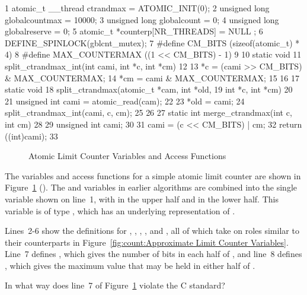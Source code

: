 { \scriptsize
\begin{verbbox}
  1 atomic_t __thread ctrandmax = ATOMIC_INIT(0);
  2 unsigned long globalcountmax = 10000;
  3 unsigned long globalcount = 0;
  4 unsigned long globalreserve = 0;
  5 atomic_t *counterp[NR_THREADS] = { NULL };
  6 DEFINE_SPINLOCK(gblcnt_mutex);
  7 #define CM_BITS (sizeof(atomic_t) * 4)
  8 #define MAX_COUNTERMAX ((1 << CM_BITS) - 1)
  9 
 10 static void
 11 split_ctrandmax_int(int cami, int *c, int *cm)
 12 {
 13   *c = (cami >> CM_BITS) & MAX_COUNTERMAX;
 14   *cm = cami & MAX_COUNTERMAX;
 15 }
 16 
 17 static void
 18 split_ctrandmax(atomic_t *cam, int *old,
 19                     int *c, int *cm)
 20 {
 21   unsigned int cami = atomic_read(cam);
 22 
 23   *old = cami;
 24   split_ctrandmax_int(cami, c, cm);
 25 }
 26 
 27 static int merge_ctrandmax(int c, int cm)
 28 {
 29   unsigned int cami;
 30 
 31   cami = (c << CM_BITS) | cm;
 32   return ((int)cami);
 33 }
\end{verbbox}
}
\begin{figure}[tbp]
\centering
\theverbbox
\caption{Atomic Limit Counter Variables and Access Functions}
\label{fig:count:Atomic Limit Counter Variables and Access Functions}
\end{figure}

The variables and access functions for a simple atomic limit counter
are shown in
Figure~\ref{fig:count:Atomic Limit Counter Variables and Access Functions}
().
The  and  variables in earlier algorithms
are combined into the single variable  shown on
line~1, with  in the upper half and  in
the lower half.
This variable is of type , which has an underlying
representation of .

Lines~2-6 show the definitions for , ,
, , and , all of which
take on roles similar to their counterparts in
Figure~\ref{fig:count:Approximate Limit Counter Variables}.
Line~7 defines , which gives the number of bits in each half
of , and line~8 defines , which
gives the maximum value that may be held in either half of
.

\QuickQuiz{}
	In what way does line~7 of
	Figure~\ref{fig:count:Atomic Limit Counter Variables and Access Functions}
	violate the C standard?
 \QuickQuizEnd

